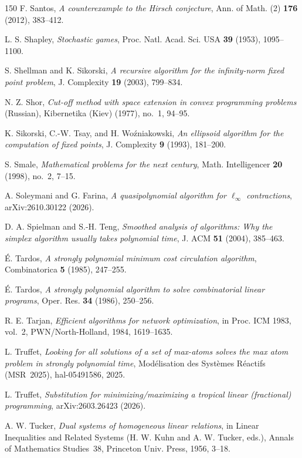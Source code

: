 \begin{thebibliography}{150}
F. Santos, \emph{A counterexample to the Hirsch conjecture}, Ann. of Math. (2) \textbf{176} (2012), 383--412.

L. S. Shapley, \emph{Stochastic games}, Proc. Natl. Acad. Sci. USA \textbf{39} (1953), 1095--1100.

S. Shellman and K. Sikorski, \emph{A recursive algorithm for the infinity-norm fixed point problem}, J. Complexity \textbf{19} (2003), 799--834.

N. Z. Shor, \emph{Cut-off method with space extension in convex programming problems} (Russian), Kibernetika (Kiev) (1977), no.~1, 94--95.

K. Sikorski, C.-W. Tsay, and H. Wo\'zniakowski, \emph{An ellipsoid algorithm for the computation of fixed points}, J. Complexity \textbf{9} (1993), 181--200.

S. Smale, \emph{Mathematical problems for the next century}, Math. Intelligencer \textbf{20} (1998), no.~2, 7--15.

A. Soleymani and G. Farina, \emph{A quasipolynomial algorithm for \(\ell_\infty\) contractions}, arXiv:2610.30122 (2026).

D. A. Spielman and S.-H. Teng, \emph{Smoothed analysis of algorithms: Why the simplex algorithm usually takes polynomial time}, J. ACM \textbf{51} (2004), 385--463.

\'{E}. Tardos, \emph{A strongly polynomial minimum cost circulation algorithm}, Combinatorica \textbf{5} (1985), 247--255.

\'{E}. Tardos, \emph{A strongly polynomial algorithm to solve combinatorial linear programs}, Oper. Res. \textbf{34} (1986), 250--256.

R. E. Tarjan, \emph{Efficient algorithms for network optimization}, in Proc. ICM 1983, vol.~2, PWN/North-Holland, 1984, 1619--1635.

L. Truffet, \emph{Looking for all solutions of a set of max-atoms solves the max atom problem in strongly polynomial time}, Mod\'elisation des Syst\`emes R\'eactifs (MSR~2025), hal-05491586, 2025.

L. Truffet, \emph{Substitution for minimizing/maximizing a tropical linear (fractional) programming}, arXiv:2603.26423 (2026).

A. W. Tucker, \emph{Dual systems of homogeneous linear relations}, in Linear Inequalities and Related Systems (H. W. Kuhn and A. W. Tucker, eds.), Annals of Mathematics Studies~38, Princeton Univ. Press, 1956, 3--18.


\end{thebibliography}
